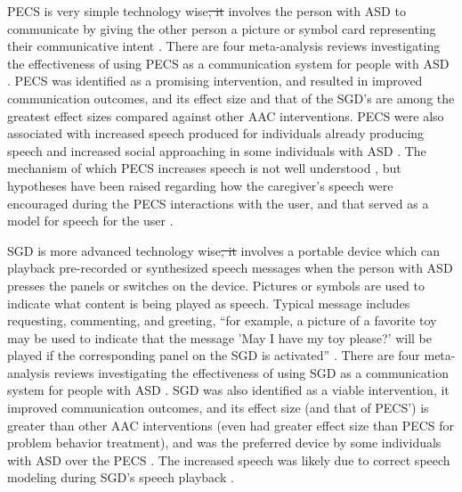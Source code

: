 \documentclass{ut-thesis}
\providecommand{\DIFaddtex}[1]{{\protect\color{blue}\uwave{#1}}} %
\providecommand{\DIFdeltex}[1]{{\protect\color{red}\sout{#1}}}                      %
\providecommand{\DIFaddbegin}{} %
\providecommand{\DIFaddend}{} %
\providecommand{\DIFdelbegin}{} %
\providecommand{\DIFdelend}{} %
\providecommand{\DIFadd}[1]{\texorpdfstring{\DIFaddtex{#1}}{#1}} %
\providecommand{\DIFdel}[1]{\texorpdfstring{\DIFdeltex{#1}}{}} %
\begin{document}
PECS is very simple technology wise\DIFdelbegin \DIFdel{, it }\DIFdelend \DIFaddbegin \DIFadd{.  It }\DIFaddend involves the person with ASD to communicate by giving the other person a picture or symbol card representing their communicative intent \cite{bondy1994picture}.  There are four meta-analysis reviews investigating the effectiveness of using PECS as a communication system for people with ASD \cite{ganz2012meta, ganz2012metab, sulzer2009picture, tincani2010quantitative}.  PECS was identified as a promising intervention, and resulted in improved communication outcomes, and its effect size and that of the SGD's are among the greatest effect sizes compared against other AAC interventions.  PECS were also associated with increased speech produced for individuals already producing speech and increased social approaching in some individuals with ASD \cite{lang2014assistive}.  The mechanism of which PECS increases speech is not well understood \cite{preston2009review}, but hypotheses have been raised regarding how the caregiver's speech were encouraged during the PECS interactions with the user, and that served as a model for speech for the user \cite{yoder2006randomized}.

SGD is more advanced technology wise\DIFdelbegin \DIFdel{, it }\DIFdelend \DIFaddbegin \DIFadd{.  It }\DIFaddend involves a portable device which can playback pre-recorded or synthesized speech messages when the person with ASD presses the panels or switches on the device.  Pictures or symbols are used to indicate what content is being played as speech.  Typical message includes requesting, commenting, and greeting, ``for example, a picture of a favorite toy may be used to indicate that the message 'May I have my toy please?' will be played if the corresponding panel on the SGD is activated'' \cite{lang2014assistive}.  There are four meta-analysis reviews investigating the effectiveness of using SGD as a communication system for people with ASD \cite{van2010communication, van2011assessing, ganz2012metab, ganz2013moderation}.  SGD was also identified as a viable intervention, it improved communication outcomes, and its effect size (and that of PECS') is greater than other AAC interventions (even had greater effect size than PECS for problem behavior treatment), and was the preferred device by some individuals with ASD over the PECS \cite{lang2014assistive}.  The increased speech was likely due to correct speech modeling during SGD's speech playback \cite{schlosser2008effects}.
\end{document}
